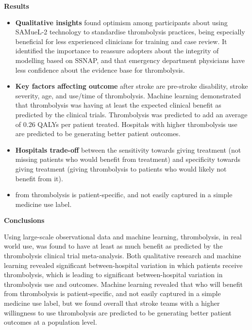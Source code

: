 \textbf{Results}

\begin{itemize}

    \item \textbf{Qualitative insights} found optimism among participants about using SAMueL-2 technology to standardise thrombolysis practices, being especially beneficial for less experienced clinicians for training and case review. It identified the importance to reassure adopters about the integrity of modelling based on SSNAP, and that emergency department physicians have less confidence about the evidence base for thrombolysis.
    
    
    \item \textbf{Key factors affecting outcome} after stroke are pre-stroke disability, stroke severity, age, and use/time of thrombolysis. Machine learning demonstrated that thrombolysis was having at least the expected clinical benefit as predicted by the clinical trials. Thrombolysis was predicted to add an average of 0.26 QALYs per patient treated. Hospitals with higher thrombolysis use are predicted to be generating better patient outcomes.
    
    \item \textbf{Hospitals trade-off} between the sensitivity towards giving treatment (not missing patients who would benefit from treatment) and specificity towards giving treatment (giving thrombolysis to patients who would likely not benefit from it).

    \item {} from thrombolysis is patient-specific, and not easily captured in a simple medicine use label.

    \end{itemize}

\textbf{Conclusions}

Using large-scale observational data and machine learning, thrombolysis, in real world use, was found to have at least as much benefit as predicted by the thrombolysis clinical trial meta-analysis. Both qualitative research and machine learning revealed significant between-hospital variation in which patients receive thrombolysis, which is leading to significant between-hospital variation in thrombolysis use and outcomes. Machine learning revealed that who will benefit from thrombolysis is patient-specific, and not easily captured in a simple medicine use label, but we found overall that stroke teams with a higher willingness to use thrombolysis are predicted to be generating better patient outcomes at a population level.

